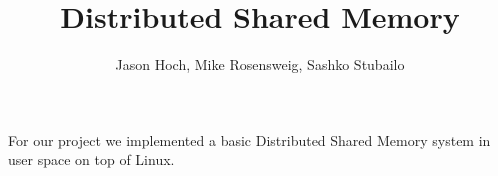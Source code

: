 \documentclass[a4paper,10pt]{article}
\title{Distributed Shared Memory}
\author{Jason Hoch, Mike Rosensweig, Sashko Stubailo}
\begin{document}
\maketitle
\doublespace
For our project we implemented a basic Distributed Shared Memory system in user
space on top of Linux.  
\end{document}

